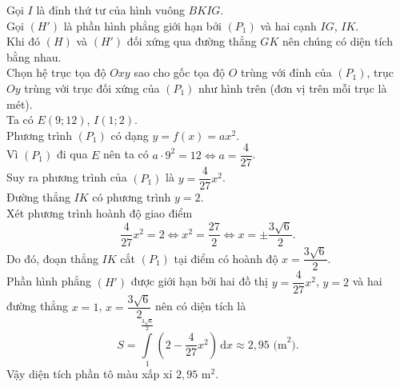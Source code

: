 \begin{ex}
{\begin{center}
		\end{center}
		Gọi $I$ là đỉnh thứ tư của hình vuông $BKIG$.\\
		Gọi $(H')$ là phần hình phẳng giới hạn bởi $(P_1)$ và hai cạnh $IG$, $IK$.\\
		Khi đó $(H)$ và $(H')$ đối xứng qua đường thẳng $GK$ nên chúng có diện tích bằng nhau.\\
		Chọn hệ trục tọa độ $Oxy$ sao cho gốc tọa độ $O$ trùng với đỉnh của $(P_1)$, trục $Oy$ trùng với trục đối xứng của $(P_1)$ như hình trên (đơn vị trên mỗi trục là mét).\\
		Ta có $E(9;12)$, $I(1;2)$.\\
		Phương trình $(P_1)$ có dạng $y=f(x)=ax^2$.\\
		Vì $(P_1)$ đi qua $E$ nên ta có $a \cdot 9^2=12 \Leftrightarrow a=\dfrac{4}{27}$.\\
		Suy ra phương trình của $(P_1)$ là $y=\dfrac{4}{27}x^2$.\\
		Đường thẳng $IK$ có phương trình $y=2$.\\
		Xét phương trình hoành độ giao điểm
		\[\dfrac{4}{27}x^2=2 \Leftrightarrow x^2=\dfrac{27}{2} \Leftrightarrow x=\pm \dfrac{3\sqrt{6}}{2}.\]
		Do đó, đoạn thẳng $IK$ cắt $(P_1)$ tại điểm có hoành độ $x = \dfrac{3\sqrt{6}}{2}$.\\
		Phần hình phẳng $(H')$ được giới hạn bởi hai đồ thị $y=\dfrac{4}{27}x^2$, $y=2$ và hai đường thẳng $x=1$, $x=\dfrac{3\sqrt{6}}{2}$ nên có diện tích là
		\[S=\displaystyle\int\limits_1^{\frac{3\sqrt{6}}{2}} \left(2-\dfrac{4}{27}x^2\right) \mathrm{\,d}x \approx 2{,}95 \text{ (m}^2\text{)}.\]
		Vậy diện tích phần tô màu xấp xỉ $2{,}95$ m$^2$.
	}
\end{ex}

